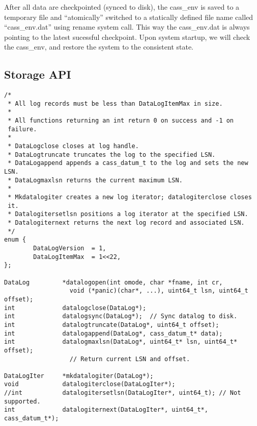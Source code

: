 After all data are checkpointed (synced to disk), the cass\_env is
saved to a temporary file and ``atomically'' switched to a statically
defined file name called ``cass\_env.dat'' using rename system
call. This way the cass\_env.dat is always pointing to the latest
sucessful checkpoint. Upon system startup, we will check the
cass\_env, and restore the system to the consistent state.

\subsection {Storage API}
\begin{verbatim}
/*
 * All log records must be less than DataLogItemMax in size.
 *
 * All functions returning an int return 0 on success and -1 on
 failure.
 *
 * DataLogclose closes at log handle.
 * DataLogtruncate truncates the log to the specified LSN.
 * DataLogappend appends a cass_datum_t to the log and sets the new LSN.
 * DataLogmaxlsn returns the current maximum LSN.
 *
 * Mkdatalogiter creates a new log iterator; datalogiterclose closes
 it.
 * Datalogitersetlsn positions a log iterator at the specified LSN.
 * Datalogiternext returns the next log record and associated LSN.
 */
enum {
        DataLogVersion  = 1,
        DataLogItemMax  = 1<<22,
};

DataLog         *datalogopen(int omode, char *fname, int cr, 
                  void (*panic)(char*, ...), uint64_t lsn, uint64_t offset);
int             datalogclose(DataLog*);
int             datalogsync(DataLog*);  // Sync datalog to disk.
int             datalogtruncate(DataLog*, uint64_t offset);
int             datalogappend(DataLog*, cass_datum_t* data);
int             datalogmaxlsn(DataLog*, uint64_t* lsn, uint64_t* offset);
                  // Return current LSN and offset.

DataLogIter     *mkdatalogiter(DataLog*);
void            datalogiterclose(DataLogIter*);
//int           datalogitersetlsn(DataLogIter*, uint64_t); // Not supported.
int             datalogiternext(DataLogIter*, uint64_t*, cass_datum_t*);
\end{verbatim}

